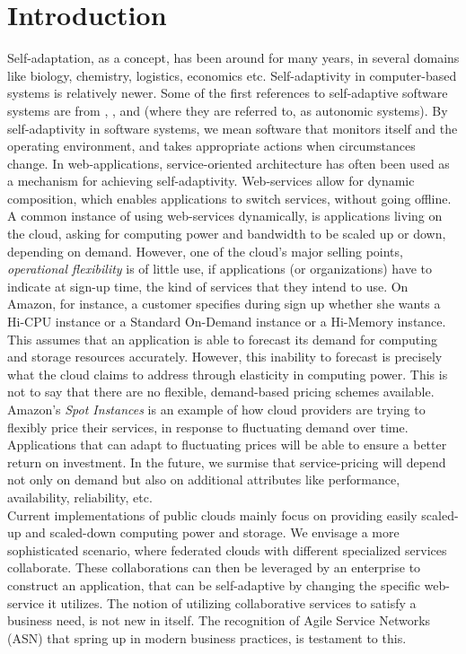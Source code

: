\documentclass[10pt,journal,compsoc]{IEEEtran}
\begin{document}
\section{Introduction}
Self-adaptation, as a concept, has been around for many years, in several domains like biology, chemistry, logistics, economics etc. Self-adaptivity in computer-based systems is relatively newer. Some of the first references to self-adaptive software systems are from \cite{Oreizy1998Architecture-based}, \cite{Laddaga1999Guest}, \cite{Kokar1999Control} and \cite{Kephart2003Vision} (where they are referred to, as autonomic systems). By self-adaptivity in software systems, we mean software that monitors itself and the operating environment, and takes appropriate actions when circumstances change. In web-applications, service-oriented architecture has often been used as a mechanism for achieving self-adaptivity\cite{DiNitto2008journey}. Web-services allow for dynamic composition, which enables applications to switch services, without going offline. A common instance of using web-services dynamically, is applications living on the cloud, asking for computing power and bandwidth to be scaled up or down, depending on demand. However, one of the cloud's major selling points, \textit{operational flexibility} is of little use, if applications (or organizations) have to indicate at sign-up time, the kind of services that they intend to use. On Amazon, for instance, a customer specifies during sign up whether she wants a Hi-CPU instance or a Standard On-Demand instance or a Hi-Memory instance. This assumes that an application is able to forecast its demand for computing and storage resources accurately. However, this inability to forecast is precisely what the cloud claims to address through elasticity in computing power. This is not to say that there are no flexible, demand-based pricing schemes available. Amazon's \textit{Spot Instances} \cite{Amazon2010SpotInstance} is an example of how cloud providers are trying to flexibly price their services, in response to fluctuating demand over time. Applications that can adapt to fluctuating prices will be able to ensure a better return on investment. In the future, we surmise that service-pricing will depend not only on demand but also on additional attributes like performance, availability, reliability, etc.
\\ 
Current implementations of public clouds mainly focus on providing easily scaled-up and scaled-down computing power and storage. We envisage a more sophisticated scenario, where federated clouds with different specialized services collaborate. These collaborations can then be leveraged by an enterprise to construct an application, that can be self-adaptive by changing the specific web-service it utilizes. The notion of utilizing collaborative services to satisfy a business need, is not new in itself. The recognition of Agile Service Networks (ASN) that spring up in modern business practices, is testament to this. 
\end{document}

